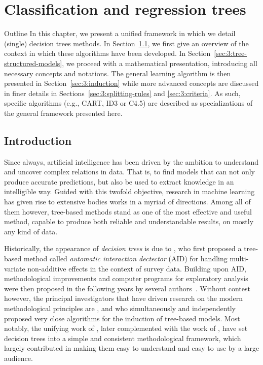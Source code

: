 \chapter{Classification and regression trees}\label{ch:cart}

\begin{remark}{Outline}
In this chapter, we present a unified framework in which we detail (single)
decision trees methods. In Section~\ref{sec:3:introduction}, we first give an
overview of the context in which these algorithms have been developed. In
Section~\ref{sec:3:tree-structured-models}, we proceed with a mathematical
presentation, introducing all necessary concepts and notations. The general
learning algorithm is then presented in Section~\ref{sec:3:induction} while
more advanced concepts are discussed in finer details in Sections~\ref{sec:3:splitting-rules}
and \ref{sec:3:criteria}. As such, specific algorithms (e.g.,
CART, ID3 or C4.5) are described as specializations of the general framework
presented here.
\end{remark}

\section{Introduction}
\label{sec:3:introduction}

Since always, artificial intelligence has been driven by the ambition to
understand and uncover complex relations in data. That is, to find models that
can not only produce accurate predictions, but also be used to extract
knowledge in an intelligible way. Guided with this twofold objective, research
in machine learning has given rise to extensive bodies works in a myriad of
directions. Among all of them however, tree-based methods stand as one of
the most effective and useful method, capable to produce both reliable and
understandable results, on mostly any kind of data.

Historically, the appearance of \textit{decision trees} is due to
\citet{morgan:1963}, who first proposed a tree-based method called
\textit{automatic interaction dectector} (AID) for handling multi-variate
non-additive effects in the context of survey data. Building upon AID,
methodological improvements and computer programs for exploratory analysis were
then proposed in the following years by several
authors~\citep{sonquist:1970,messenger:1972,gillo:1972,sonquist:1974}. Without
contest however, the principal investigators that have driven research on the modern
methodological principles are \citet{breiman:1978a,breiman:1978b},
\citet{friedman:1977,friedman:1979} and \citet{quinlan:1979,quinlan:1986} who
simultaneously and independently proposed very close algorithms for the
induction of tree-based models. Most notably, the unifying work of
\citet{breiman:1984}, later complemented with the work of \citet{quinlan:1993},
have set decision trees into a simple and consistent methodological framework,
which largely contributed in making them easy to understand and easy to use by
a large audience.

